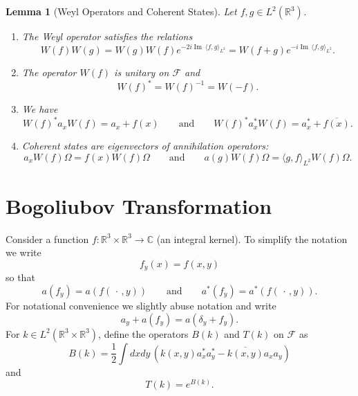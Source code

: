 \documentclass[11pt,a4paper,draft,DIV11]{scrartcl}	%
\newtheorem{lem}[thm]{Lemma}
\newcommand{\R}{\mathds{R}}
\newcommand{\N}{\mathcal{N}}
\newcommand{\Rbb}{\mathbb{R}}		%
\newcommand{\Cbb}{\mathbb{C}}		%
\renewcommand{\Im}{\operatorname{Im}\,} 	%
\newcommand{\be}[1]{\begin{equation}\label{eq:#1}}	%
\newcommand{\ee}{\end{equation}}
\begin{document}
\begin{lem}[Weyl Operators and Coherent States] \label{l:W}
  Let $f, g \in L^2(\R^3)$.
  \begin{enumerate}
    \item \label{l:W1} The Weyl operator satisfies the relations
      \[
        W(f) W(g) = W(g) W(f) e^{-2i \Im \langle f, g \rangle_{L^2}} = W(f+g)
        e^{-i \Im \langle f, g \rangle_{L^2}}.
      \]
    \item \label{l:W2} The operator $W(f)$ is unitary on $\mathcal{F}$ and
      \[
        W(f)^* = W(f)^{-1} = W(-f).
      \]
    \item \label{l:W3} We have
      \[
        W(f)^* a_x W(f) = a_x + f(x) \qquad \text{and} \qquad W(f)^* a_x^*
        W(f) = a_x^* + \overline{f(x)}.
      \]
    \item \label{l:W4} Coherent states are
      eigenvectors of annihilation operators:
      \[
        a_x W(f)\Omega = f(x) W(f)\Omega \qquad \text{and} \qquad a(g) W(f)\Omega
        = \langle g, f \rangle_{L^2} W(f)\Omega.
      \]
\iffalse    \item \label{l:W5} The expectation of the number of particles in the
      coherent state $\psi(f)$ is given by $\| f \|_{L^2}^2$, that is,
      \[
        \langle \psi(f), \N^2 \psi(f) \rangle = \| f \|_{L^2}^2.
      \]
      Also the variance of the number of particles in $\psi(f)$ is given by
      $\| f \|_{L^2}$ (the distribution of $\N$ is poisson), that is,
      \[
        \langle \psi(f), \N^2 \psi(f) \rangle - \langle \psi(f), \N \psi(f)
        \rangle^2 = \| f \|_{L^2}^2.
      \]
    \item \label{l:W6} Coherent states are normalized but not orthogonal to
      each other. In fact,
      \[
        \langle \psi(f), \psi(g) \rangle = e^{-\frac{1}{2} (\| f \|_{L^2}^2 +
        \| g \|_{L^2}^2 - 2 \langle f, g \rangle_{L^2} )} \qquad \text{so
        that} \qquad |\langle \psi(f), \psi(g) \rangle| = e^{-\frac{1}{2} \| f
        - g \|_{L^2}^2}.
      \]\fi
  \end{enumerate}
\end{lem}


\section{Bogoliubov Transformation}
Consider a function $f\colon \Rbb^3\times\Rbb^3 \to \Cbb$ (an integral kernel). To simplify the
notation we write
\be{no1}
  f_y(x) = f(x,y)
\ee
so that
\[
  a(f_y) = a(f(\,\cdot\,,y)) \qquad \text{and} \qquad a^*(f_y) =
  a^*(f(\,\cdot\,,y)).
\]
For notational convenience we slightly abuse notation and
write
\[
  a_y + a(f_y) = a(\delta_y + f_y).
\]
%
For $k \in L^2(\R^3 \times \R^3)$, define the operators $B(k)$ and $T(k)$ on
$\mathcal{F}$ as
\[
  B(k) = \frac{1}{2} \int dxdy \, (k(x,y) a_x^* a_y^* - \overline{k(x,y)} a_x
  a_y)
\]
and
\[
  T(k) = e^{B(k)}.
\]
\end{document}
